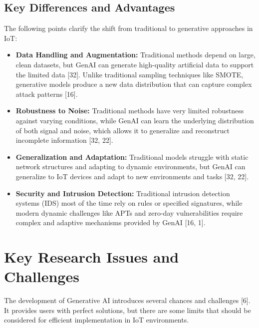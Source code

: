 \documentclass[journal]{IEEEtran}
\begin{document}
\subsection{Key Differences and Advantages}
The following points clarify the shift from traditional to generative approaches in IoT:

\begin{itemize}
    \item \textbf{Data Handling and Augmentation:} Traditional methods depend on large, clean datasets, but GenAI can generate high-quality artificial data to support the limited data [32]. Unlike traditional sampling techniques like SMOTE, generative models produce a new data distribution that can capture complex attack patterns [16].
    
    \item \textbf{Robustness to Noise:} Traditional methods have very limited robustness against varying conditions, while GenAI can learn the underlying distribution of both signal and noise, which allows it to generalize and reconstruct incomplete information [32, 22].
    
    \item \textbf{Generalization and Adaptation:} Traditional models struggle with static network structures and adapting to dynamic environments, but GenAI can generalize to IoT devices and adapt to new environments and tasks [32, 22].
    
    \item \textbf{Security and Intrusion Detection:} Traditional intrusion detection systems (IDS) most of the time rely on rules or specified signatures, while modern dynamic challenges like APTs and zero-day vulnerabilities require complex and adaptive mechanisms provided by GenAI [16, 1].
\end{itemize}

\section{Key Research Issues and Challenges}
The development of Generative AI introduces several chances and challenges [6]. It provides users with perfect solutions, but there are some limits that should be considered for efficient implementation in IoT environments.
\end{document}
